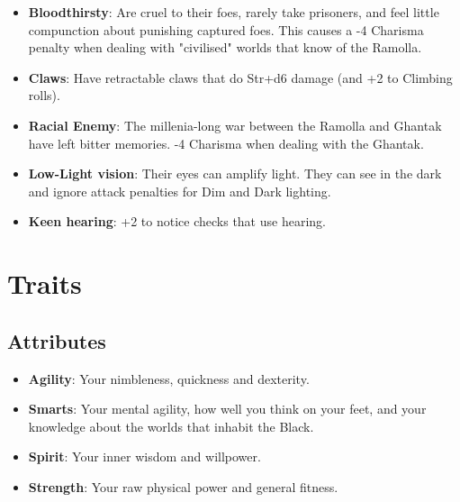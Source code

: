 \documentclass[10pt,twoside]{article}
\begin{document}
\begin{multicols}{2}
\begin{itemize}
            \item \textbf{Bloodthirsty}: Are cruel to their foes, rarely take prisoners, and feel little compunction about punishing captured foes. This causes a -4 Charisma penalty when dealing with "civilised" worlds that know of the Ramolla.

            \item \textbf{Claws}: Have retractable claws that do Str+d6 damage (and +2 to Climbing rolls).

            \item \textbf{Racial Enemy}: The millenia-long war between the Ramolla and Ghantak have left bitter memories. -4 Charisma when dealing with the Ghantak.

            \item \textbf{Low-Light vision}: Their eyes can amplify light. They can see in the dark and ignore attack penalties for Dim and Dark lighting.

            \item \textbf{Keen hearing}: +2 to notice checks that use hearing.
        \end{itemize}


        \section{Traits}

        \subsection{Attributes}

        \begin{itemize}

            \item \textbf{Agility}: Your nimbleness, quickness and dexterity.

            \item \textbf{Smarts}: Your mental agility, how well you think on your feet, and your knowledge about the worlds that inhabit the Black.

            \item \textbf{Spirit}: Your inner wisdom and willpower.

            \item \textbf{Strength}: Your raw physical power and general fitness.


\end{itemize}
\end{multicols}
\end{document}
